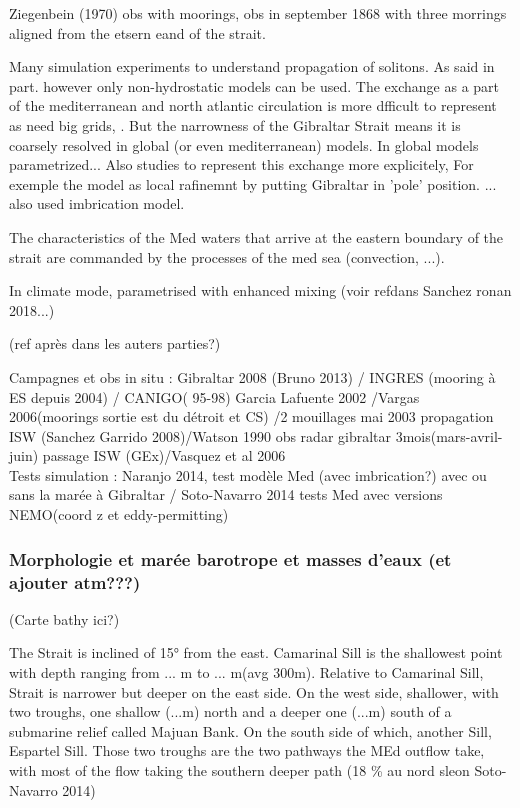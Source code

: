 Ziegenbein (1970) obs with moorings, obs in september 1868 with three morrings aligned from the etsern eand of the strait. 

Many simulation experiments to understand propagation of solitons. As said in part. however only non-hydrostatic models can be used. The exchange as a part of the mediterranean and north atlantic circulation is more dfficult to represent as need big grids, . 
But the narrowness of the Gibraltar Strait means it is coarsely resolved in global (or even mediterranean) models. In global models parametrized...
Also studies to represent this exchange more explicitely, For exemple the model as local rafinemnt by putting Gibraltar in 'pole' position. ... also used imbrication model.

The characteristics of the Med waters that arrive at the eastern boundary of the strait are commanded by the processes of the med sea (convection, ...). 


In climate mode, parametrised with enhanced mixing (voir refdans Sanchez ronan 2018...)

(ref après dans les auters parties?)

Campagnes et obs in situ : Gibraltar 2008 (Bruno 2013) / INGRES (mooring à ES depuis 2004) / CANIGO( 95-98) Garcia Lafuente 2002 /Vargas 2006(moorings sortie est du détroit et CS) /2 mouillages mai 2003 propagation ISW (Sanchez Garrido 2008)/Watson 1990 obs radar gibraltar 3mois(mars-avril-juin) passage ISW (GEx)/Vasquez et al 2006\\

Tests simulation : Naranjo 2014, test modèle Med (avec imbrication?) avec ou sans la marée à Gibraltar / Soto-Navarro 2014 tests Med avec versions NEMO(coord z et eddy-permitting)



\subsubsection{Morphologie et marée barotrope et masses d'eaux (et ajouter atm???)}

(Carte bathy ici?)

The Strait is inclined of 15° from the east. Camarinal Sill is the shallowest point with depth ranging from ... m to ... m(avg 300m). Relative to Camarinal Sill, Strait is narrower but deeper on the east side. On the west side, shallower, with two troughs, one shallow (...m) north and a deeper one (...m) south of a submarine relief called Majuan Bank. On the south side of which, another Sill, Espartel Sill. Those two troughs are the two pathways the MEd outflow take, with most of the flow taking the southern deeper path (18 \% au nord sleon Soto-Navarro 2014)



